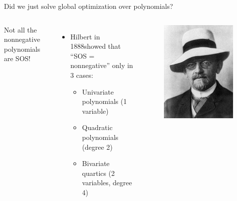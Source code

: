 \documentclass[aspectratio=169]{beamer}
\begin{document}
\begin{frame}{Did we just solve global optimization over polynomials?}
\begin{columns}
Not all the nonnegative polynomials are SOS!
\begin{itemize}
\item
Hilbert in 1888\footnotemark showed that ``SOS = nonnegative'' only in 3 cases\footnotemark:
\begin{itemize}
\item
Univariate polynomials (1 variable)
\item
Quadratic polynomials (degree 2)
\item
Bivariate quartics (2 variables, degree 4)
\end{itemize}
\end{itemize}
\begin{figure}
\includegraphics[width=.4\columnwidth]{figures/hilbert.jpg}
\end{figure}
\end{columns}
\end{frame}
\end{document}

